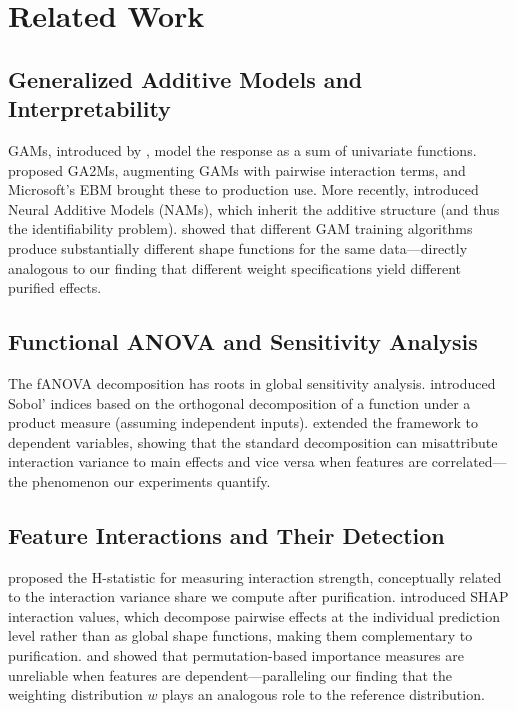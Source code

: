 \chapter{Related Work}\label{chap:related}

\section{Generalized Additive Models and Interpretability}

\Glspl{GAM}, introduced by \citet{hastie1986generalized}, model the response as a sum of univariate functions.
\citet{lou2012intelligible, lou2013accurate} proposed \glspl{GA2M}, augmenting GAMs with pairwise interaction terms, and Microsoft's \gls{EBM} \citep{nori2019interpretml} brought these to production use.
More recently, \citet{agarwal2021neural} introduced Neural Additive Models (NAMs), which inherit the additive structure (and thus the identifiability problem).
\citet{chang2021how} showed that different GAM training algorithms produce substantially different shape functions for the same data---directly analogous to our finding that different weight specifications yield different purified effects.

\section{Functional ANOVA and Sensitivity Analysis}

The \gls{fANOVA} decomposition has roots in global sensitivity analysis.
\citet{sobol2001global} introduced Sobol' indices based on the orthogonal decomposition of a function under a product measure (assuming independent inputs).
\citet{hooker2007generalized} extended the framework to dependent variables, showing that the standard decomposition can misattribute interaction variance to main effects and vice versa when features are correlated---the phenomenon our experiments quantify.

\section{Feature Interactions and Their Detection}

\citet{friedman2008predictive} proposed the H-statistic for measuring interaction strength, conceptually related to the interaction variance share we compute after purification.
\citet{lundberg2017unified} introduced \gls{SHAP} interaction values, which decompose pairwise effects at the individual prediction level rather than as global shape functions, making them complementary to purification.
\citet{hooker2021unrestricted} and \citet{strobl2008conditional} showed that permutation-based importance measures are unreliable when features are dependent---paralleling our finding that the weighting distribution $w$ plays an analogous role to the reference distribution.

